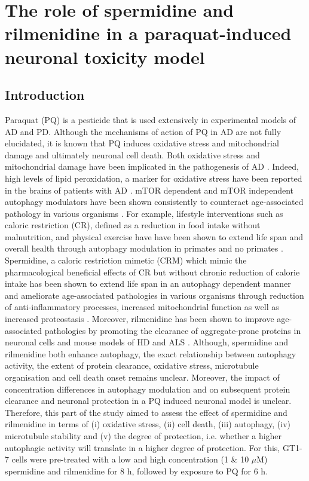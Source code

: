 \chapter{The role of spermidine and rilmenidine in a paraquat-induced neuronal toxicity model}
\label{sec:chapter4}
\section{Introduction}
Paraquat (PQ) is a pesticide that is used extensively in experimental models of AD and PD. Although the mechanisms of action of PQ in AD are not fully elucidated, it is known that PQ induces oxidative stress and mitochondrial damage \citep{Chen2012} and ultimately neuronal cell death. Both oxidative stress and mitochondrial damage have been implicated in the pathogenesis of AD \citep{Chen2012,Lin2006}. Indeed, high levels of lipid peroxidation, a marker for oxidative stress have been reported in the brains of patients with AD \citep{Wang2014,Zhao2013}. mTOR dependent and mTOR independent autophagy modulators have been shown consistently to counteract age-associated pathology in various organisms \citep{lumkwana2017}. For example, lifestyle interventions such as caloric restriction (CR), defined as a reduction in food intake without malnutrition,  and physical exercise have have been shown to extend life span and overall health through autophagy modulation in primates and no primates \citep{Law2018,Frederiksen2017,Liu2019,Lin2017}. Spermidine, a caloric restriction mimetic (CRM) which mimic the pharmacological beneficial effects of CR but without chronic reduction of calorie intake has been shown to extend life span in an autophagy dependent manner and ameliorate age-associated pathologies in various organisms \citep{Buttner2014,Eisenberg2016a,Gupta2016,Morselli2011,Morselli2009,Sigrist2014,Yue2017,Zhang2017} through reduction of anti-inflammatory processes, increased mitochondrial function as well as increased proteostasis \citep{Madeo2018}. Moreover, rilmenidine has been shown to improve age-associated pathologies by promoting the clearance of aggregate-prone proteins in neuronal cells and mouse models of HD and ALS \citep{Perera2018,Rose2010}. Although, spermidine and rilmenidine both enhance autophagy, the exact relationship between autophagy activity, the extent of protein clearance, oxidative stress, microtubule organisation and cell death onset remains unclear. Moreover, the impact of concentration differences in autophagy modulation and on subsequent protein clearance and neuronal protection in a PQ induced neuronal model is unclear. Therefore, this part of the study aimed to assess the effect of spermidine and rilmenidine in terms of (i) oxidative stress, (ii) cell death, (iii) autophagy, (iv) microtubule stability and (v) the degree of protection, i.e. whether a higher autophagic activity will translate in a higher degree of protection. For this, GT1-7 cells were pre-treated with a low and high concentration (1 \& 10 $\mu$M) spermidine and rilmenidine for 8 h, followed by exposure to PQ for 6 h.

